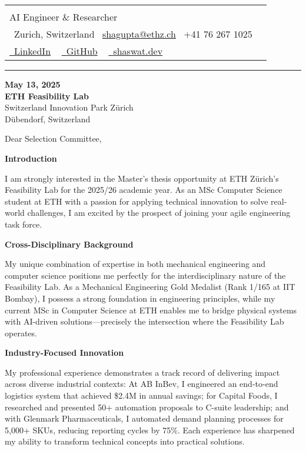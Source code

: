 \documentclass[letterpaper,10pt]{article}
\makeatletter
\newcommand{\icontext}[2]{\raisebox{-0.2\height}{#1}~#2}
\newcommand{\profileheader}{%
  \begin{profilebox}
    \begin{tabularx}{\textwidth}{@{}l@{\hspace{1.1cm}}X@{}}
      \fcolorbox{accentblue}{white}{
        \texttt{[image: shaswat.png]}
      }
      &
      \begin{minipage}[b]{\linewidth}
        {\Huge \textcolor{darkroyalblue}{\scshape Shaswat Gupta}} \\[3pt]
        {\large \textcolor{mutedtext}{AI Engineer \& Researcher}} \\[6pt]
        \icontext{\faMapMarker}{\textcolor{mutedtext}{Zurich, Switzerland}} \quad
        \icontext{\faEnvelope}{\href{mailto:shagupta@ethz.ch}{\textcolor{accentblue}{shagupta@ethz.ch}}} \quad
        \icontext{\faPhone}{\textcolor{accentblue}{+41 76 267 1025}} \\[5pt]
        \href{https://linkedin.com/in/shaswat-gupta/}{\icontext{\faLinkedin}{\textcolor{accentblue}{LinkedIn}}} ~
        \href{https://github.com/Shaswat-G}{\icontext{\faGithub}{\textcolor{accentblue}{GitHub}}} ~
        \href{https://shaswat.dev}{\icontext{\faGlobe}{\textcolor{accentblue}{shaswat.dev}}}
      \end{minipage}
    \end{tabularx}
    \vspace{6pt}
    \hrule height 1.2pt \color{bordercolor}
  \end{profilebox}
}
\newcommand{\letterSection}[1]{%
  \begin{sectionbox}
    \color{darkroyalblue}\scshape\raggedright\large\bfseries #1
  \end{sectionbox}
}
\makeatother
\begin{document}
\profileheader

{\color{mutedtext}
\begin{justify} %
\textbf{May 13, 2025} \\[1pt]
\textbf{ETH Feasibility Lab} \\
Switzerland Innovation Park Zürich \\
Dübendorf, Switzerland
\end{justify}
}

\vspace{8pt}

{\color{headercolor}
\begin{justify} %
Dear Selection Committee,
\end{justify}
}


\letterSection{Introduction}
\begin{justify}
I am strongly interested in the Master's thesis opportunity at ETH Zürich's Feasibility Lab for the 2025/26 academic year. As an MSc Computer Science student at ETH with a passion for applying technical innovation to solve real-world challenges, I am excited by the prospect of joining your agile engineering task force.
\end{justify}

\letterSection{Cross-Disciplinary Background}
\begin{justify}
My unique combination of expertise in both mechanical engineering and computer science positions me perfectly for the interdisciplinary nature of the Feasibility Lab. As a Mechanical Engineering Gold Medalist (Rank 1/165 at IIT Bombay), I possess a strong foundation in engineering principles, while my current MSc in Computer Science at ETH enables me to bridge physical systems with AI-driven solutions—precisely the intersection where the Feasibility Lab operates.
\end{justify}


\letterSection{Industry-Focused Innovation}
\begin{justify}
My professional experience demonstrates a track record of delivering impact across diverse industrial contexts: At AB InBev, I engineered an end-to-end logistics system that achieved \$2.4M in annual savings; for Capital Foods, I researched and presented 50+ automation proposals to C-suite leadership; and with Glenmark Pharmaceuticals, I automated demand planning processes for 5,000+ SKUs, reducing reporting cycles by 75\%. Each experience has sharpened my ability to transform technical concepts into practical solutions.
\end{justify}
\end{document}
